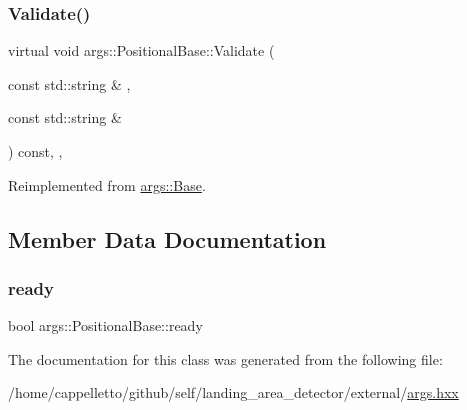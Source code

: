 \subsubsection{\texorpdfstring{Validate()}{Validate()}}
{\footnotesize\ttfamily virtual void args\+::\+Positional\+Base\+::\+Validate (\begin{DoxyParamCaption}\item[{const std\+::string \&}]{,  }\item[{const std\+::string \&}]{ }\end{DoxyParamCaption}) const\hspace{0.3cm}{\ttfamily [inline]}, {\ttfamily [override]}, {\ttfamily [virtual]}}



Reimplemented from \hyperlink{classargs_1_1_base_a62ea917978306062785cbfaa4dd51d2f}{args\+::\+Base}.



\subsection{Member Data Documentation}
\mbox{\label{classargs_1_1_positional_base_a3c1226976201c0c62cbd63c5da0a401e}} 
\subsubsection{\texorpdfstring{ready}{ready}}
{\footnotesize\ttfamily bool args\+::\+Positional\+Base\+::ready\hspace{0.3cm}{\ttfamily [protected]}}



The documentation for this class was generated from the following file\+:\begin{DoxyCompactItemize}
\item 
/home/cappelletto/github/self/landing\+\_\+area\+\_\+detector/external/\hyperlink{args_8hxx}{args.\+hxx}\end{DoxyCompactItemize}
